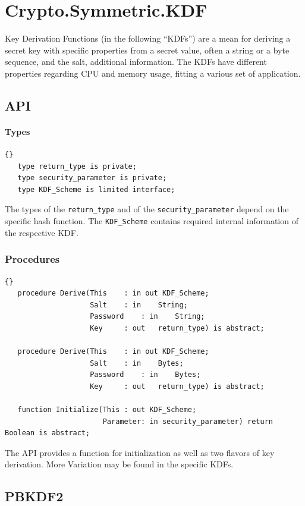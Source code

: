 \chapter{Crypto.Symmetric.KDF}
Key Derivation Functions (in the following “KDFs”) are a mean for deriving a secret key with specific properties from a secret value, often a string or a byte sequence, and the salt, additional information. The KDFs have different properties regarding CPU and memory usage, fitting a various set of application.
\section{API}
\subsubsection*{Types}
\begin{lstlisting}{}
   type return_type is private;
   type security_parameter is private;
   type KDF_Scheme is limited interface;
\end{lstlisting}
The types of the \texttt{return\_type} and of the \texttt{security\_parameter} depend on the specific hash function. The \texttt{KDF\_Scheme} contains required internal information of the respective KDF.
\subsection*{Procedures}
\begin{lstlisting}{}
   procedure Derive(This	: in out KDF_Scheme;
                    Salt	: in 	String;
                    Password	: in	String;
                    Key		: out	return_type) is abstract;

   procedure Derive(This	: in out KDF_Scheme;
                    Salt	: in 	Bytes;
                    Password	: in	Bytes;
                    Key		: out	return_type) is abstract;

   function Initialize(This	: out KDF_Scheme;
                       Parameter: in security_parameter) return Boolean is abstract; 

\end{lstlisting}
The API provides a function for initialization as well as two flavors of key derivation. More Variation may be found in the specific KDFs. 

\section{PBKDF2}

